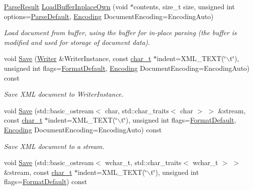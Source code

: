 \begin{DoxyCompactItemize}
\hyperlink{structphys_1_1xml_1_1ParseResult}{ParseResult} \hyperlink{classphys_1_1xml_1_1Document_a9213b8bf4fa5423ea292a3d03c826608}{LoadBufferInplaceOwn} (void $\ast$contents, size\_\-t size, unsigned int options=\hyperlink{namespacephys_1_1xml_aa6b8f7f8c2322fd683a235b498834d60}{ParseDefault}, \hyperlink{namespacephys_1_1xml_a420f5de782438f88160321385bea2015}{Encoding} DocumentEncoding=EncodingAuto)
\begin{DoxyCompactList}\small\item\em Load document from buffer, using the buffer for in-\/place parsing (the buffer is modified and used for storage of document data). \item\end{DoxyCompactList}\item 
void \hyperlink{classphys_1_1xml_1_1Document_a6aacc12d692e13976c568ed50186b85d}{Save} (\hyperlink{classphys_1_1xml_1_1Writer}{Writer} \&WriterInstance, const \hyperlink{namespacephys_1_1xml_afc87705cd1c2917d87b879715a2d8f6e}{char\_\-t} $\ast$indent=XML\_\-TEXT(\char`\"{}$\backslash$t\char`\"{}), unsigned int flags=\hyperlink{namespacephys_1_1xml_a08bf6aab51f79929d9097706a5e64408}{FormatDefault}, \hyperlink{namespacephys_1_1xml_a420f5de782438f88160321385bea2015}{Encoding} DocumentEncoding=EncodingAuto) const 
\begin{DoxyCompactList}\small\item\em Save XML document to WriterInstance. \item\end{DoxyCompactList}\item 
void \hyperlink{classphys_1_1xml_1_1Document_aa9f44d46ec6139680ebde26122cc6281}{Save} (std::basic\_\-ostream$<$ char, std::char\_\-traits$<$ char $>$ $>$ \&stream, const \hyperlink{namespacephys_1_1xml_afc87705cd1c2917d87b879715a2d8f6e}{char\_\-t} $\ast$indent=XML\_\-TEXT(\char`\"{}$\backslash$t\char`\"{}), unsigned int flags=\hyperlink{namespacephys_1_1xml_a08bf6aab51f79929d9097706a5e64408}{FormatDefault}, \hyperlink{namespacephys_1_1xml_a420f5de782438f88160321385bea2015}{Encoding} DocumentEncoding=EncodingAuto) const 
\begin{DoxyCompactList}\small\item\em Save XML document to a stream. \item\end{DoxyCompactList}\item 
void \hyperlink{classphys_1_1xml_1_1Document_a034a5497b68d8531886fdc7a6a67bd7d}{Save} (std::basic\_\-ostream$<$ wchar\_\-t, std::char\_\-traits$<$ wchar\_\-t $>$ $>$ \&stream, const \hyperlink{namespacephys_1_1xml_afc87705cd1c2917d87b879715a2d8f6e}{char\_\-t} $\ast$indent=XML\_\-TEXT(\char`\"{}$\backslash$t\char`\"{}), unsigned int flags=\hyperlink{namespacephys_1_1xml_a08bf6aab51f79929d9097706a5e64408}{FormatDefault}) const 

\end{DoxyCompactItemize}
